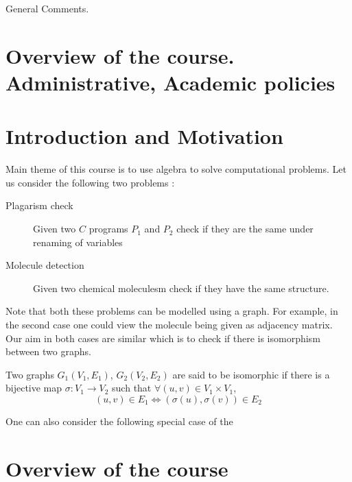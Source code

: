 
\noindent
General Comments.

\section{Overview of the course. Administrative, Academic policies}


\section{Introduction and Motivation}
Main theme of this course is to use algebra to solve computational problems.
Let us consider the following two problems :
\begin{description}
	\item [Plagarism check]
	Given two $C$ programs $P_1$ and $P_2$ check if they are the same
	under renaming of variables
	\item [Molecule detection]
	Given two chemical moleculesm check if they have the same structure.
\end{description}

Note that both these problems can be modelled using a graph. For example, in
the second case one could view the molecule being given as adjacency matrix.
Our aim in both cases are similar which is to check if there is isomorphism
between two graphs.

\begin{definition}
	Two graphs $G_1(V_1,E_1)$, $G_2(V_2,E_2)$ are said to be isomorphic if
	there is a bijective map $\sigma:V_1 \to V_2$ such that $\forall
	(u,v) \in V_1 \times V_1$, \[(u,v) \in E_1 \iff (\sigma(u), \sigma(v))
	\in E_2 \]
\end{definition}

One can also consider the following special case of the 

\section{Overview of the course}



